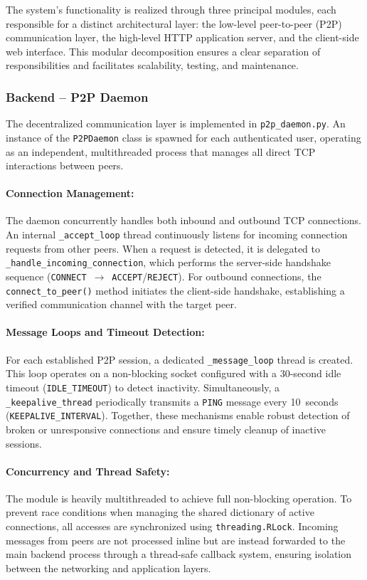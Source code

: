 The system’s functionality is realized through three principal modules, each responsible for a distinct architectural layer: 
the low-level peer-to-peer (P2P) communication layer, the high-level HTTP application server, and the client-side web interface. 
This modular decomposition ensures a clear separation of responsibilities and facilitates scalability, testing, and maintenance.

\subsubsection{Backend -- P2P Daemon}

The decentralized communication layer is implemented in \texttt{p2p\_daemon.py}. 
An instance of the \texttt{P2PDaemon} class is spawned for each authenticated user, operating as an independent, multithreaded process that manages all direct TCP interactions between peers.

\paragraph{Connection Management:}
The daemon concurrently handles both inbound and outbound TCP connections. 
An internal \texttt{\_accept\_loop} thread continuously listens for incoming connection requests from other peers. 
When a request is detected, it is delegated to \texttt{\_handle\_incoming\_connection}, which performs the server-side handshake sequence (\texttt{CONNECT}~$\rightarrow$~\texttt{ACCEPT}/\texttt{REJECT}).  
For outbound connections, the \texttt{connect\_to\_peer()} method initiates the client-side handshake, establishing a verified communication channel with the target peer.

\paragraph{Message Loops and Timeout Detection:}
For each established P2P session, a dedicated \texttt{\_message\_loop} thread is created. 
This loop operates on a non-blocking socket configured with a 30-second idle timeout (\texttt{IDLE\_TIMEOUT}) to detect inactivity. 
Simultaneously, a \texttt{\_keepalive\_thread} periodically transmits a \texttt{PING} message every 10~seconds (\texttt{KEEPALIVE\_INTERVAL}). 
Together, these mechanisms enable robust detection of broken or unresponsive connections and ensure timely cleanup of inactive sessions.

\paragraph{Concurrency and Thread Safety:}
The module is heavily multithreaded to achieve full non-blocking operation. 
To prevent race conditions when managing the shared dictionary of active connections, all accesses are synchronized using \texttt{threading.RLock}. 
Incoming messages from peers are not processed inline but are instead forwarded to the main backend process through a thread-safe callback system, ensuring isolation between the networking and application layers.

